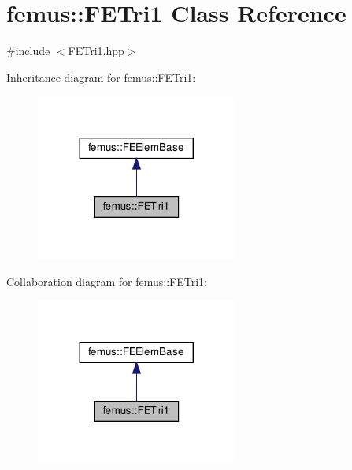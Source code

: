 \hypertarget{classfemus_1_1_f_e_tri1}{}\section{femus\+:\+:F\+E\+Tri1 Class Reference}
\label{classfemus_1_1_f_e_tri1}


{\ttfamily \#include $<$F\+E\+Tri1.\+hpp$>$}



Inheritance diagram for femus\+:\+:F\+E\+Tri1\+:
\nopagebreak
\begin{figure}[H]
\begin{center}
\leavevmode
\includegraphics[width=188pt]{classfemus_1_1_f_e_tri1__inherit__graph}
\end{center}
\end{figure}


Collaboration diagram for femus\+:\+:F\+E\+Tri1\+:
\nopagebreak
\begin{figure}[H]
\begin{center}
\leavevmode
\includegraphics[width=188pt]{classfemus_1_1_f_e_tri1__coll__graph}
\end{center}
\end{figure}
